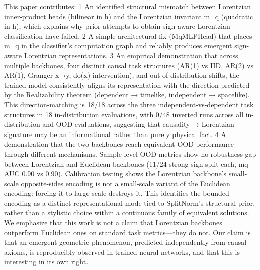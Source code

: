 This paper contributes:
	1	An identified structural mismatch between Lorentzian inner-product heads (bilinear in h) and the Lorentzian invariant m_q (quadratic in h), which explains why prior attempts to obtain sign-aware Lorentzian classification have failed.
	2	A simple architectural fix (MqMLPHead) that places m_q in the classifier's computation graph and reliably produces emergent sign-aware Lorentzian representations.
	3	An empirical demonstration that across multiple backbones, four distinct causal task structures (AR(1) vs IID, AR(2) vs AR(1), Granger x→y, do(x) intervention), and out-of-distribution shifts, the trained model consistently aligns its representation with the direction predicted by the Realizability theorem (dependent → timelike, independent → spacelike). This direction-matching is 18/18 across the three independent-vs-dependent task structures in 18 in-distribution evaluations, with 0/48 inverted runs across all in-distribution and OOD evaluations, suggesting that causality → Lorentzian signature may be an informational rather than purely physical fact.
	4	A demonstration that the two backbones reach equivalent OOD performance through different mechanisms. Sample-level OOD metrics show no robustness gap between Lorentzian and Euclidean backbones (11/24 strong sign-split each, mq-AUC 0.90 vs 0.90). Calibration testing shows the Lorentzian backbone's small-scale opposite-sides encoding is not a small-scale variant of the Euclidean encoding: forcing it to large scale destroys it. This identifies the bounded encoding as a distinct representational mode tied to SplitNorm's structural prior, rather than a stylistic choice within a continuous family of equivalent solutions.
We emphasize that this work is not a claim that Lorentzian backbones outperform Euclidean ones on standard task metrics—they do not. Our claim is that an emergent geometric phenomenon, predicted independently from causal axioms, is reproducibly observed in trained neural networks, and that this is interesting in its own right.

